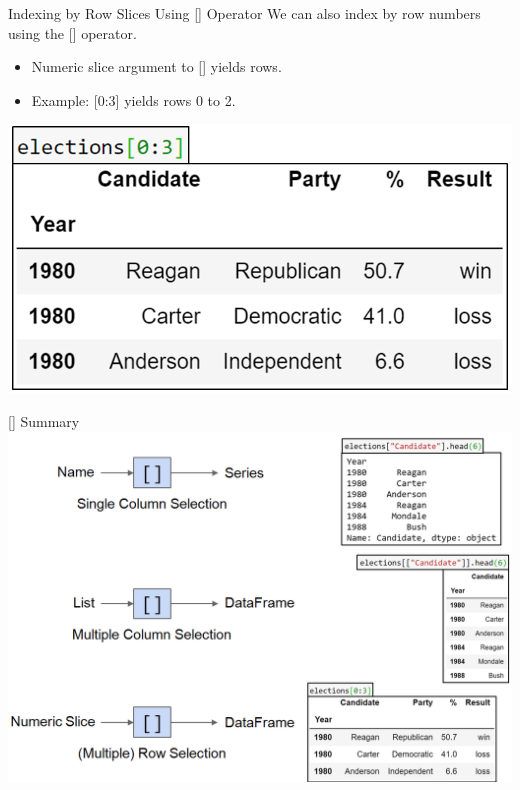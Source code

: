 \documentclass[aspectratio=169]{../latex_main/tntbeamer}  %
\begin{document}
	
	
	\begin{frame}{Indexing by Row Slices Using [] Operator}
        We can also index by row numbers using the [] operator. 
        \begin{itemize}
            \item Numeric slice argument to [] yields rows.
            \item Example: [0:3] yields rows 0 to 2.
        \end{itemize}
    
    	\centering
	    \includegraphics[scale=.5]{Bild14}
	\end{frame}
	
	
	
	\begin{frame}{[] Summary}
    	\centering
	    \includegraphics[scale=.33]{Bild15}
	\end{frame}
	
\end{document}
